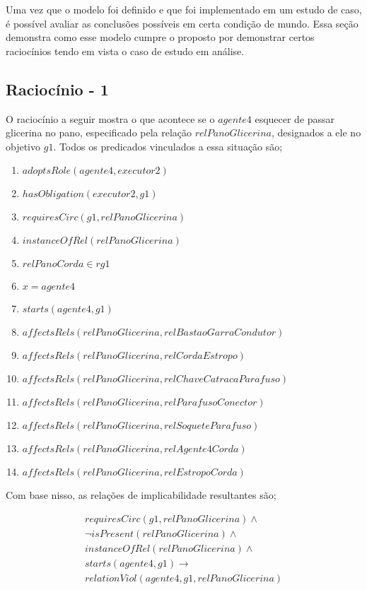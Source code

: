 \label{racs}

Uma vez que o modelo foi definido e que foi implementado em um estudo de caso, é possível avaliar as conclusões possíveis em certa condição de mundo. Essa seção demonstra como esse modelo cumpre o proposto por demonstrar certos raciocínios tendo em vista o caso de estudo em análise. 

\subsection{Raciocínio - 1} 
\label{raciocinio1}

O raciocínio a seguir mostra o que acontece se o $agente4$ esquecer de passar glicerina no pano, especificado pela relação $relPanoGlicerina$, designados a ele no objetivo $g1$. 
Todos os predicados vinculados a essa situação são;

\begin{enumerate}
	\item $adoptsRole(agente4,executor2)$ 
	\item $hasObligation(executor2,g1)$
	\item $requiresCirc(g1,relPanoGlicerina)$
	\item $instanceOfRel(relPanoGlicerina)$ 
	\item $relPanoCorda \in rg1$
	\item $ x = agente4 $
	\item $starts(agente4,g1)$
	\item $affectsRels(relPanoGlicerina,relBastaoGarraCondutor)$
	\item $affectsRels(relPanoGlicerina,relCordaEstropo)$  
	\item $affectsRels(relPanoGlicerina,relChaveCatracaParafuso)$
	\item $affectsRels(relPanoGlicerina,relParafusoConector)$ 
	\item $affectsRels(relPanoGlicerina,relSoqueteParafuso)$ 
	\item $affectsRels(relPanoGlicerina,relAgente4Corda)$ 
	\item $affectsRels(relPanoGlicerina,relEstropoCorda)$	
\end{enumerate}

Com base nisso, as relações de implicabilidade resultantes são;

\begin{eqnarray}\nonumber
	requiresCirc(g1,relPanoGlicerina) \wedge \nonumber \\  
	\neg isPresent(relPanoGlicerina) \wedge \nonumber \\   
	instanceOfRel(relPanoGlicerina) \wedge \nonumber \\   
	starts(agente4,g1) \to \nonumber \\
	relationViol(agente4,g1,relPanoGlicerina) \nonumber \\  
\end{eqnarray}

